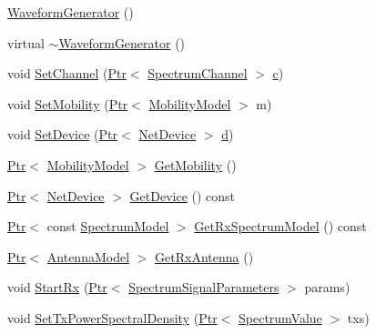 \begin{DoxyCompactItemize}
\item 
\hyperlink{classns3_1_1WaveformGenerator_a7616ee9719989efceb5435b32f46e1fb}{Waveform\+Generator} ()
\item 
virtual \hyperlink{classns3_1_1WaveformGenerator_a22367acf51e58936cd16b0d9dd93e7d9}{$\sim$\+Waveform\+Generator} ()
\item 
void \hyperlink{classns3_1_1WaveformGenerator_a16860b869b6e336689660d26b45dcffe}{Set\+Channel} (\hyperlink{classns3_1_1Ptr}{Ptr}$<$ \hyperlink{classns3_1_1SpectrumChannel}{Spectrum\+Channel} $>$ \hyperlink{mmwave_2model_2fading-traces_2fading__trace__generator_8m_ae0323a9039add2978bf5b49550572c7c}{c})
\item 
void \hyperlink{classns3_1_1WaveformGenerator_a1493e1cf7f733f14217d014a6b47fddb}{Set\+Mobility} (\hyperlink{classns3_1_1Ptr}{Ptr}$<$ \hyperlink{classns3_1_1MobilityModel}{Mobility\+Model} $>$ m)
\item 
void \hyperlink{classns3_1_1WaveformGenerator_a33bc14a6b0c38b6ba245b98eb2e8e2ca}{Set\+Device} (\hyperlink{classns3_1_1Ptr}{Ptr}$<$ \hyperlink{classns3_1_1NetDevice}{Net\+Device} $>$ \hyperlink{lte__pathloss_8m_a1aabac6d068eef6a7bad3fdf50a05cc8}{d})
\item 
\hyperlink{classns3_1_1Ptr}{Ptr}$<$ \hyperlink{classns3_1_1MobilityModel}{Mobility\+Model} $>$ \hyperlink{classns3_1_1WaveformGenerator_a06fcbc59bf56424308d9b0771af08548}{Get\+Mobility} ()
\item 
\hyperlink{classns3_1_1Ptr}{Ptr}$<$ \hyperlink{classns3_1_1NetDevice}{Net\+Device} $>$ \hyperlink{classns3_1_1WaveformGenerator_a1e0896b363690d27f10f2efd0a2aae31}{Get\+Device} () const 
\item 
\hyperlink{classns3_1_1Ptr}{Ptr}$<$ const \hyperlink{classns3_1_1SpectrumModel}{Spectrum\+Model} $>$ \hyperlink{classns3_1_1WaveformGenerator_a99d3d06889f70abf4457fa0f3945b681}{Get\+Rx\+Spectrum\+Model} () const 
\item 
\hyperlink{classns3_1_1Ptr}{Ptr}$<$ \hyperlink{classns3_1_1AntennaModel}{Antenna\+Model} $>$ \hyperlink{classns3_1_1WaveformGenerator_a69aa7c2c910ffac566330c3e856b724d}{Get\+Rx\+Antenna} ()
\item 
void \hyperlink{classns3_1_1WaveformGenerator_a019a2938bf0c2d6f7228d5b79b8a8739}{Start\+Rx} (\hyperlink{classns3_1_1Ptr}{Ptr}$<$ \hyperlink{structns3_1_1SpectrumSignalParameters}{Spectrum\+Signal\+Parameters} $>$ params)
\item 
void \hyperlink{classns3_1_1WaveformGenerator_ae4e8fb49cc64954886b4eba3bd450543}{Set\+Tx\+Power\+Spectral\+Density} (\hyperlink{classns3_1_1Ptr}{Ptr}$<$ \hyperlink{classns3_1_1SpectrumValue}{Spectrum\+Value} $>$ txs)

\end{DoxyCompactItemize}
